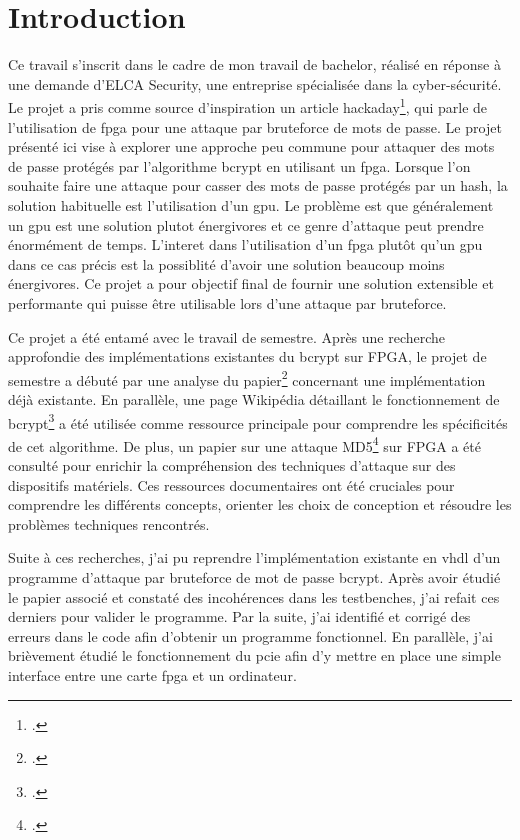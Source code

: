 \chapter*{Introduction}


Ce travail s'inscrit dans le cadre de mon travail de bachelor, réalisé en réponse à une demande d'ELCA Security, une entreprise spécialisée dans la cyber-sécurité. 
Le projet a pris comme source d'inspiration un article hackaday\footcite{by_all_2020}, qui parle de l'utilisation de \gls{fpga} pour une attaque par bruteforce de mots de passe.
Le projet présenté ici vise à explorer une approche peu commune pour attaquer des mots de passe protégés par l'algorithme bcrypt en utilisant un \gls{fpga}. 
Lorsque l'on souhaite faire une attaque pour casser des mots de passe protégés par un hash, la solution habituelle est l'utilisation d'un \gls{gpu}.
Le problème est que généralement un \gls{gpu} est une solution plutot énergivores et ce genre d'attaque peut prendre énormément de temps.
L'interet dans l'utilisation d'un \gls{fpga} plutôt qu'un \gls{gpu} dans ce cas précis est la possiblité d'avoir une solution beaucoup moins énergivores.
Ce projet a pour objectif final de fournir une solution extensible et performante qui puisse être utilisable lors d'une attaque par bruteforce. 


Ce projet a été entamé avec le travail de semestre.
Après une recherche approfondie des implémentations existantes du bcrypt sur FPGA, le projet de semestre a débuté par une analyse du papier\footcite{wiemer_high-speed_2014} concernant une implémentation déjà existante. 
En parallèle, une page Wikipédia détaillant le fonctionnement de bcrypt\footcite{noauthor_bcrypt_2024} a été utilisée comme ressource principale pour comprendre les spécificités de cet algorithme. 
De plus, un papier sur une attaque MD5\footcite{gillela_parallelization_2019} sur FPGA a été consulté pour enrichir la compréhension des techniques d'attaque sur des dispositifs matériels. 
Ces ressources documentaires ont été cruciales pour comprendre les différents concepts, orienter les choix de conception et résoudre les problèmes techniques rencontrés.

Suite à ces recherches, j'ai pu reprendre l'implémentation existante en \gls{vhdl} d'un programme d'attaque par bruteforce de mot de passe bcrypt. 
Après avoir étudié le papier associé et constaté des incohérences dans les testbenches, j'ai refait ces derniers pour valider le programme. 
Par la suite, j'ai identifié et corrigé des erreurs dans le code afin d'obtenir un programme fonctionnel. 
En parallèle, j'ai brièvement étudié le fonctionnement du \gls{pcie} afin d'y mettre en place une simple interface entre une carte \gls{fpga} et un ordinateur.

